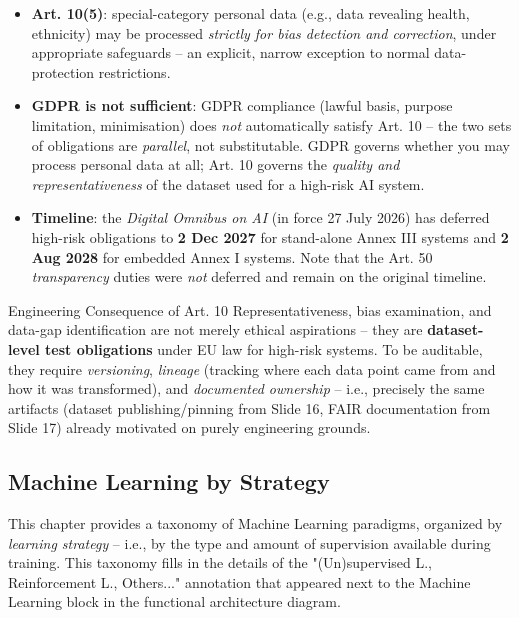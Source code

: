 \begin{itemize}
    \item \textbf{Art. 10(5)}: special-category personal data (e.g., data revealing health, ethnicity) may be processed \emph{strictly for bias detection and correction}, under appropriate safeguards -- an explicit, narrow exception to normal data-protection restrictions.
    \vspace{0.2cm}
    \item \textbf{GDPR is not sufficient}: GDPR compliance (lawful basis, purpose limitation, minimisation) does \emph{not} automatically satisfy Art. 10 -- the two sets of obligations are \emph{parallel}, not substitutable. GDPR governs whether you may process personal data at all; Art. 10 governs the \emph{quality and representativeness} of the dataset used for a high-risk AI system.
    \vspace{0.2cm}
    \item \textbf{Timeline}: the \emph{Digital Omnibus on AI} (in force 27 July 2026) has deferred high-risk obligations to \textbf{2 Dec 2027} for stand-alone Annex III systems and \textbf{2 Aug 2028} for embedded Annex I systems. Note that the Art. 50 \emph{transparency} duties were \emph{not} deferred and remain on the original timeline.
\end{itemize}

\begin{defbox}{Engineering Consequence of Art. 10}
Representativeness, bias examination, and data-gap identification are not merely ethical aspirations -- they are \textbf{dataset-level test obligations} under EU law for high-risk systems. To be auditable, they require \emph{versioning}, \emph{lineage} (tracking where each data point came from and how it was transformed), and \emph{documented ownership} -- i.e., precisely the same artifacts (dataset publishing/pinning from Slide 16, FAIR documentation from Slide 17) already motivated on purely engineering grounds.
\end{defbox}

\subsection{Machine Learning by Strategy}

This chapter provides a taxonomy of Machine Learning paradigms, organized by \emph{learning strategy} -- i.e., by the type and amount of supervision available during training. This taxonomy fills in the details of the "(Un)supervised L., Reinforcement L., Others..." annotation that appeared next to the Machine Learning block in the functional architecture diagram.

